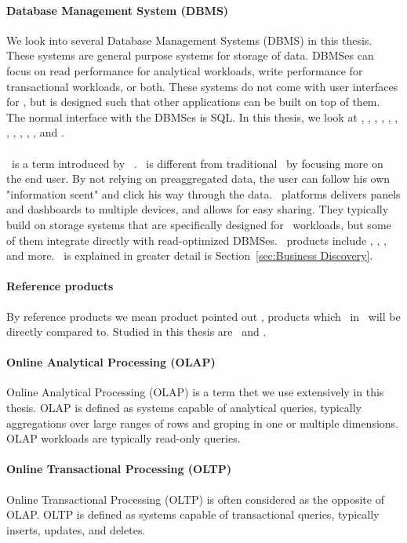 \paragraph{Database Management System (DBMS)}
\label{par:Database Management System (DBMS)}
We look into several Database Management Systems (DBMS) in this thesis. These systems are general purpose systems for storage of data. DBMSes can focus on read performance for analytical workloads, write performance for transactional workloads, or both. These systems do not come with user interfaces for \bd, but is designed such that other applications can be built on top of them. The normal interface with the DBMSes is SQL. In this thesis, we look at \oracle, \ibm, \saph, \sapnw, \mssql, \cstore, \vertica, \blink, \exasol, \oracle, \hyper, and \hyrise.

\paragraph{\bd}
\label{par:Business Discovery}
\bd~is a term introduced by \qlikview~\cite{Qlik2014-vd}. \bd~is different from traditional \bi~by focusing more on the end user. By not relying on preaggregated data, the user can follow his own "information scent" and click his way through the data. \bd~platforms delivers panels and dashboards to multiple devices, and allows for easy sharing. They typically build on storage systems that are specifically designed for \bd~workloads, but some of them integrate directly with read-optimized DBMSes. \bd~products include \tableau, \qlikview, \powerpivot, and more. \bd~is explained in greater detail is Section~\ref{sec:Business Discovery}.

\paragraph{Reference products}
\label{par:Reference products}
By reference products we mean product pointed out \genus, products which \bd~in \genusSoftware~will be directly compared to. Studied in this thesis are \qlikview~and \tableau.

\paragraph{Online Analytical Processing (OLAP)}
\label{par:Online Analytical Processing (OLAP)}
Online Analytical Processing (OLAP) is a term thet we use extensively in this thesis. OLAP is defined as systems capable of analytical queries, typically aggregations over large ranges of rows and groping in one or multiple dimensions. OLAP workloads are typically read-only queries.
\paragraph{Online Transactional Processing (OLTP)}
\label{par:Online Transactional Processing (OLTP)}
Online Transactional Processing (OLTP) is often considered as the opposite of OLAP. OLTP is defined as systems capable of transactional queries, typically inserts, updates, and deletes. 





